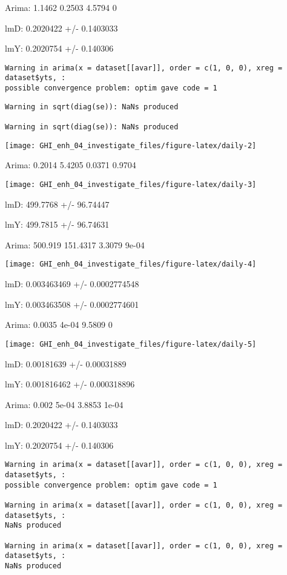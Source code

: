 \documentclass[
  10pt,
  a4paper,oneside]{article}
\begin{document}
Arima: 1.1462 0.2503 4.5794 0

lmD: 0.2020422 +/- 0.1403033

lmY: 0.2020754 +/- 0.140306

\begin{verbatim}
Warning in arima(x = dataset[[avar]], order = c(1, 0, 0), xreg = dataset$yts, :
possible convergence problem: optim gave code = 1
\end{verbatim}

\begin{verbatim}
Warning in sqrt(diag(se)): NaNs produced

Warning in sqrt(diag(se)): NaNs produced
\end{verbatim}

\begin{center}\texttt{[image: GHI\_enh\_04\_investigate\_files/figure-latex/daily-2]} \end{center}

Arima: 0.2014 5.4205 0.0371 0.9704

\begin{center}\texttt{[image: GHI\_enh\_04\_investigate\_files/figure-latex/daily-3]} \end{center}

lmD: 499.7768 +/- 96.74447

lmY: 499.7815 +/- 96.74631

Arima: 500.919 151.4317 3.3079 9e-04

\begin{center}\texttt{[image: GHI\_enh\_04\_investigate\_files/figure-latex/daily-4]} \end{center}

lmD: 0.003463469 +/- 0.0002774548

lmY: 0.003463508 +/- 0.0002774601

Arima: 0.0035 4e-04 9.5809 0

\begin{center}\texttt{[image: GHI\_enh\_04\_investigate\_files/figure-latex/daily-5]} \end{center}

lmD: 0.00181639 +/- 0.00031889

lmY: 0.001816462 +/- 0.000318896

Arima: 0.002 5e-04 3.8853 1e-04

lmD: 0.2020422 +/- 0.1403033

lmY: 0.2020754 +/- 0.140306

\begin{verbatim}
Warning in arima(x = dataset[[avar]], order = c(1, 0, 0), xreg = dataset$yts, :
possible convergence problem: optim gave code = 1

Warning in arima(x = dataset[[avar]], order = c(1, 0, 0), xreg = dataset$yts, :
NaNs produced

Warning in arima(x = dataset[[avar]], order = c(1, 0, 0), xreg = dataset$yts, :
NaNs produced
\end{verbatim}
\end{document}
